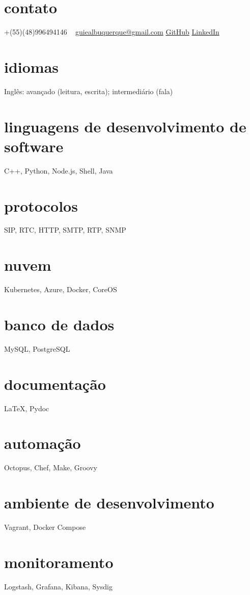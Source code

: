 \documentclass[]{friggeri-cv} %
\begin{document}



\begin{aside} %
\section{contato}
+(55)(48)996494146
~
\href{mailto:guiealbuquerque@gmail.com}{guiealbuquerque@gmail.com}
\href{https://github.com/heisendumb}{GitHub}
\href{https://www.linkedin.com/in/heisenbugger/}{LinkedIn}
\section{idiomas}
Inglês: avançado (leitura, escrita); intermediário (fala)
\section{linguagens de desenvolvimento de software}
C++, Python, Node.js, Shell, Java
\section{protocolos}
SIP, RTC, HTTP, SMTP, RTP, SNMP
\section{nuvem}
Kubernetes, Azure, Docker, CoreOS
\section{banco de dados}
MySQL, PostgreSQL
\section{documentação}
LaTeX, Pydoc
\section{automação}
Octopus, Chef, Make, Groovy
\section{ambiente de desenvolvimento}
Vagrant, Docker Compose
\section{monitoramento}
Logstash, Grafana, Kibana, Sysdig
\end{aside}
\end{document}
